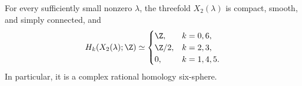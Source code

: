 \begin{theorem}\label{main:theorem}
For every sufficiently small nonzero \(\lambda\), the threefold
\(X_2(\lambda)\) is compact, smooth, and simply connected, and
\begin{equation}
 H_k(X_2(\lambda);\Z)\simeq
 \begin{cases}
 \Z,&k=0,6,\\
 \Z/2,&k=2,3,\\
 0,&k=1,4,5.
 \end{cases}
 \label{main:homology}
\end{equation}
In particular, it is a complex rational homology six-sphere.
\end{theorem}
